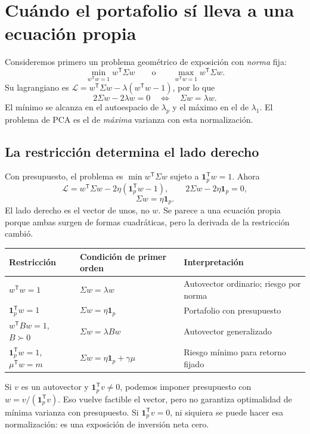 \documentclass[11pt,a4paper]{article}
\newcommand{\T}{^{\mathsf T}}
\newcommand{\ones}{\mathbf 1}
\theoremstyle{definition}
\begin{document}
\section{Cuándo el portafolio sí lleva a una ecuación propia}
Consideremos primero un problema geométrico de exposición con \emph{norma} fija:
\[
\min_{w\T w=1}w\T\Sigma w\qquad\text{o}\qquad
\max_{w\T w=1}w\T\Sigma w.
\]
Su lagrangiano es $\mathcal L=w\T\Sigma w-\lambda(w\T w-1)$, por lo que
\[
2\Sigma w-2\lambda w=0\quad\Longleftrightarrow\quad
\boxed{\Sigma w=\lambda w}.
\]
El mínimo se alcanza en el autoespacio de $\lambda_p$ y el máximo en el de $\lambda_1$. El problema de PCA es el de \emph{máxima} varianza con esta normalización.
\subsection{La restricción determina el lado derecho}
Con presupuesto, el problema es $\min w\T\Sigma w$ sujeto a $\ones_p\T w=1$. Ahora
\[
\mathcal L=w\T\Sigma w-2\eta(\ones_p\T w-1),\qquad
2\Sigma w-2\eta\ones_p=0,
\]
\[
\boxed{\Sigma w=\eta\ones_p}.
\]
El lado derecho es el vector de unos, no $w$. Se parece a una ecuación propia porque ambas surgen de formas cuadráticas, pero la derivada de la restricción cambió.
\begin{center}\small
\begin{tabular}{p{4.2cm}p{5.2cm}p{5.6cm}}\toprule
Restricción & Condición de primer orden & Interpretación\\\midrule
$w\T w=1$ & $\Sigma w=\lambda w$ & Autovector ordinario; riesgo por norma\\
$\ones_p\T w=1$ & $\Sigma w=\eta\ones_p$ & Portafolio con presupuesto\\
$w\T Bw=1$, $B\succ0$ & $\Sigma w=\lambda Bw$ & Autovector generalizado\\
$\ones_p\T w=1$, $\mu\T w=m$ & $\Sigma w=\eta\ones_p+\gamma\mu$ & Riesgo mínimo para retorno fijado\\\bottomrule
\end{tabular}\end{center}
\begin{cuidado}
Si $v$ es un autovector y $\ones_p\T v\ne0$, podemos imponer presupuesto con $w=v/(\ones_p\T v)$. Eso vuelve factible el vector, pero no garantiza optimalidad de mínima varianza con presupuesto. Si $\ones_p\T v=0$, ni siquiera se puede hacer esa normalización: es una exposición de inversión neta cero.
\end{cuidado}
\end{document}
